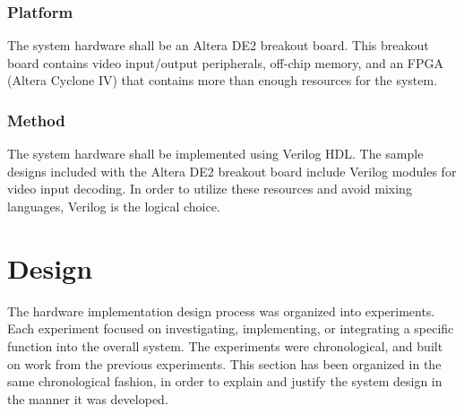 \documentclass[11pt]{article} %
\begin{document}
\subsubsection{Platform}
The system hardware shall be an Altera DE2 breakout board. This breakout board contains video input/output peripherals, off-chip memory, and an FPGA (Altera Cyclone IV) that contains more than enough resources for the system.
\subsubsection{Method}
The system hardware shall be implemented using Verilog HDL. The sample designs included with the Altera DE2 breakout board include Verilog modules for video input decoding. In order to utilize these resources and avoid mixing languages, Verilog is the logical choice.
\section{Design}
\label{sec:design}
The hardware implementation design process was organized into experiments. Each experiment focused on investigating, implementing, or integrating a specific function into the overall system. The experiments were chronological, and built on work from the previous experiments. This section has been organized in the same chronological fashion, in order to explain and justify the system design in the manner it was developed.
\end{document}
